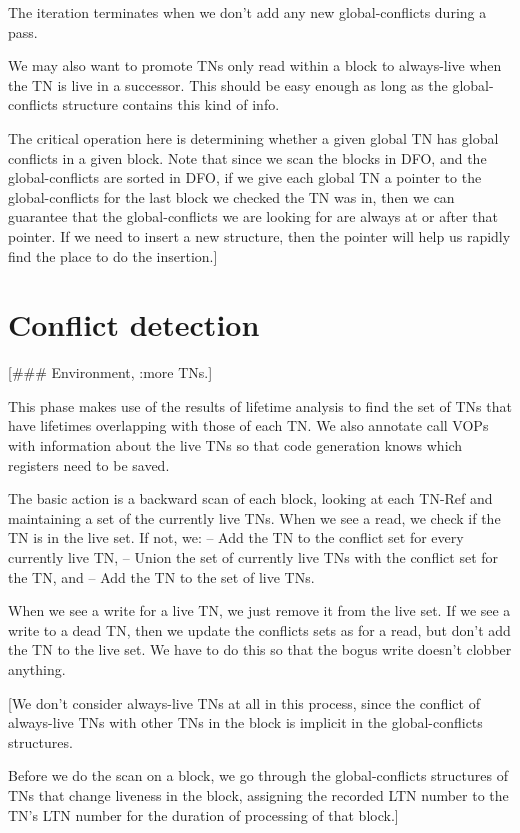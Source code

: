The iteration terminates when we don't add any new global-conflicts during a
pass.

We may also want to promote TNs only read within a block to always-live when
the TN is live in a successor.  This should be easy enough as long as the
global-conflicts structure contains this kind of info.

The critical operation here is determining whether a given global TN has global
conflicts in a given block.  Note that since we scan the blocks in DFO, and the
global-conflicts are sorted in DFO, if we give each global TN a pointer to the
global-conflicts for the last block we checked the TN was in, then we can
guarantee that the global-conflicts we are looking for are always at or after
that pointer.  If we need to insert a new structure, then the pointer will help
us rapidly find the place to do the insertion.]


\section{Conflict detection}

[\#\#\# Environment, :more TNs.]

This phase makes use of the results of lifetime analysis to find the set of TNs
that have lifetimes overlapping with those of each TN.  We also annotate call
VOPs with information about the live TNs so that code generation knows which
registers need to be saved.

The basic action is a backward scan of each block, looking at each TN-Ref and
maintaining a set of the currently live TNs.  When we see a read, we check if
the TN is in the live set.  If not, we:
 -- Add the TN to the conflict set for every currently live TN,
 -- Union the set of currently live TNs with the conflict set for the TN, and
 -- Add the TN to the set of live TNs.

When we see a write for a live TN, we just remove it from the live set.  If we
see a write to a dead TN, then we update the conflicts sets as for a read, but
don't add the TN to the live set.  We have to do this so that the bogus write
doesn't clobber anything.

[We don't consider always-live TNs at all in this process, since the conflict
of always-live TNs with other TNs in the block is implicit in the
global-conflicts structures.

Before we do the scan on a block, we go through the global-conflicts structures
of TNs that change liveness in the block, assigning the recorded LTN number to
the TN's LTN number for the duration of processing of that block.]
 

